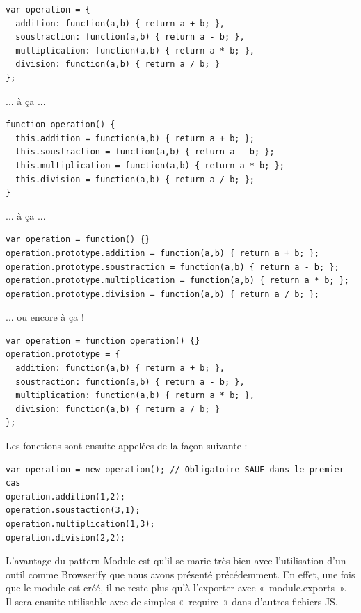 \documentclass[a4paper,12pt]{article}
\begin{document}
\begin{lstlisting}
var operation = {
  addition: function(a,b) { return a + b; },
  soustraction: function(a,b) { return a - b; },
  multiplication: function(a,b) { return a * b; },
  division: function(a,b) { return a / b; }
};
\end{lstlisting}

... à ça ...

\begin{lstlisting}
function operation() {
  this.addition = function(a,b) { return a + b; };
  this.soustraction = function(a,b) { return a - b; };
  this.multiplication = function(a,b) { return a * b; };
  this.division = function(a,b) { return a / b; };
}
\end{lstlisting}

... à ça ...

\begin{lstlisting}
var operation = function() {}
operation.prototype.addition = function(a,b) { return a + b; };
operation.prototype.soustraction = function(a,b) { return a - b; };
operation.prototype.multiplication = function(a,b) { return a * b; };
operation.prototype.division = function(a,b) { return a / b; };
\end{lstlisting}

... ou encore à ça !

\begin{lstlisting}
var operation = function operation() {}
operation.prototype = {
  addition: function(a,b) { return a + b; },
  soustraction: function(a,b) { return a - b; },
  multiplication: function(a,b) { return a * b; },
  division: function(a,b) { return a / b; }
};
\end{lstlisting}

Les fonctions sont ensuite appelées de la façon suivante :

\begin{lstlisting}
var operation = new operation(); // Obligatoire SAUF dans le premier cas
operation.addition(1,2);
operation.soustaction(3,1);
operation.multiplication(1,3);
operation.division(2,2);
\end{lstlisting}

L'avantage du pattern Module est qu'il se marie très bien avec l'utilisation d'un outil comme Browserify que nous avons présenté précédemment. En effet, une fois que le module est créé, il ne reste plus qu'à l'exporter avec «~module.exports~». Il sera ensuite utilisable avec de simples «~require~» dans d'autres fichiers JS.
\end{document}
